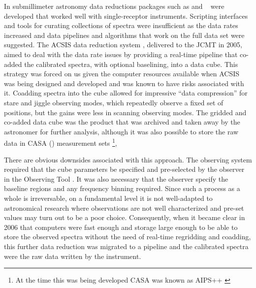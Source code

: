 \documentclass[final,authoryear,5p,times,twocolumn]{elsarticle}
\begin{document}
In submillimeter astronomy data reductions packages such as
\citep[][]{2005sf2a.conf..721P} and
\specx\ \citep[][]{SPECX} were developed that worked well with
single-receptor instruments. Scripting interfaces and tools for
curating collections of spectra were insufficient as the data rates
increased and data pipelines \citep[e.g.,][]{1995ASPC...75..117W} and
algorithms that work on the full data set
\citep[e.g.,][]{2002ASPC..278..329M} were suggested. The ACSIS data
reduction system \citep{2000ASPC..216..502L,2000SPIE.4015..114H},
delivered to the JCMT in 2005, aimed to deal with the data rate issues
by providing a real-time pipeline that co-added the calibrated
spectra, with optional baselining, into a data cube.  This strategy
was forced on us given the computer resources available when ACSIS was
being designed and developed and was known to have risks associated
with it. Coadding spectra into the cube allowed for impressive ``data
compression'' for stare and jiggle observing modes, which repeatedly
observe a fixed set of positions, but the gains were less in scanning
observing modes.
The gridded and co-added data cube was the product that was archived
and taken away by the astronomer for further analysis, although it was
also possible to store the raw data in CASA () measurement sets
\citep{2012ASPC..461..849P}\footnote{At the time this was being
developed CASA was known as AIPS++ \citep{2004ASPC..314..468M}},

There are obvious downsides associated with this approach. The
observing system required that the cube parameters be specified and
pre-selected by the observer in the Observing Tool
\citep{2002ASPC..281..453F}. It was also
necessary that the observer specify the baseline regions and any
frequency binning required. Since such a process as a whole is
irreversable, on a fundamental level it is not well-adapted to
astronomical research where observations are not well characterized
and pre-set values may turn out to be a poor choice.  Consequently,
when it became clear in 2006 that computers were fast enough and storage
large enough to be able to store the observed spectra without the need
of real-time regridding and coadding, this further data reduction was
migrated to a pipeline and the calibrated spectra were the raw data
written by the instrument.
\end{document}

